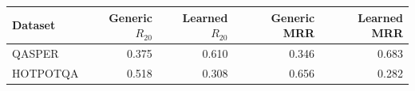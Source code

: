 \begin{tabular}{lrrrr}
\toprule
Dataset & Generic $R_{20}$ & Learned $R_{20}$ & Generic MRR & Learned MRR \\
\midrule
QASPER & 0.375 & 0.610 & 0.346 & 0.683 \\
HOTPOTQA & 0.518 & 0.308 & 0.656 & 0.282 \\
\bottomrule
\end{tabular}
